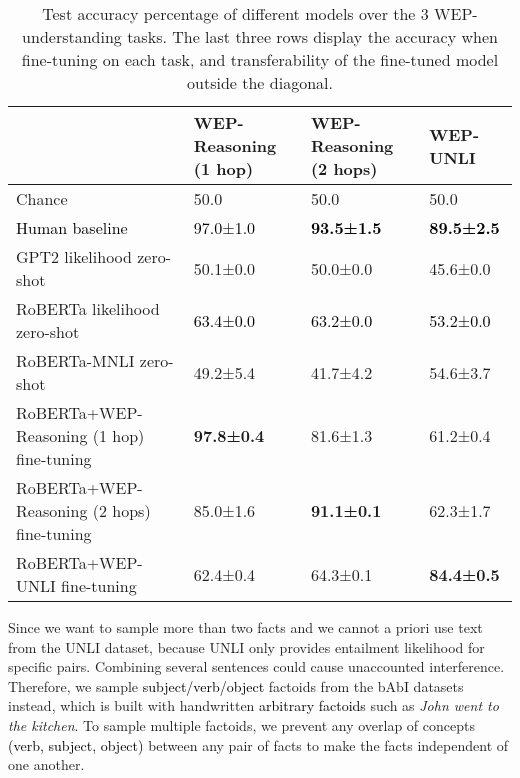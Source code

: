 \documentclass[11pt]{article}
\def \thecolor {black}
\newcommand{\blue}[1]{\textcolor{\thecolor}{#1}}
\begin{document}
\begin{table*}
\centering
\small
\begin{tabular}{llll}
\toprule
                                 &    WEP-Reasoning (1 hop) &    WEP-Reasoning (2 hops) &             WEP-UNLI \\
\midrule
            Chance &          50.0 &          50.0 &          50.0 \\
\blue{Human baseline} &  \blue{97.0±1.0}& \blue{\textbf{93.5±1.5}}&  \blue{\textbf{89.5±2.5}}\\

\midrule
            GPT2 likelihood zero-shot &          50.1±0.0 &          50.0±0.0 &          45.6±0.0 \\
    RoBERTa likelihood zero-shot &          \blue{63.4±0.0} &          \blue{63.2±0.0} &          \blue{53.2±0.0} \\
RoBERTa-MNLI  zero-shot &          49.2±5.4 &          41.7±4.2 &          54.6±3.7 \\
\midrule
          RoBERTa+WEP-Reasoning (1 hop) fine-tuning& \textbf{97.8±0.4} &          81.6±1.3 &          61.2±0.4 \\
          RoBERTa+WEP-Reasoning (2 hops) fine-tuning &          85.0±1.6 & \textbf{91.1±0.1} &          62.3±1.7 \\
                   RoBERTa+WEP-UNLI fine-tuning &          62.4±0.4 &          64.3±0.1 & \textbf{84.4±0.5} \\
\bottomrule
\end{tabular}
\vspace{-1mm}
\caption{Test accuracy percentage of different models over the 3 WEP-understanding tasks. The last three rows display the accuracy when fine-tuning on each task, and transferability of the fine-tuned model outside the diagonal. \label{tab:downstream}\vspace{-3mm}}

\end{table*}


Since we want to sample more than two facts and we cannot a priori use text from the UNLI dataset, because UNLI only provides entailment likelihood for specific pairs. Combining several sentences could cause unaccounted interference. Therefore, we sample \blue{subject/verb/object} factoids from the bAbI \cite{weston2015towards} datasets instead, which is built with handwritten \blue{arbitrary factoids} such as \textit{John went to the kitchen}. To sample multiple factoids, we prevent any overlap of concepts \blue{(verb, subject, object)} between any pair of facts to make the facts independent of one another.
\end{document}
